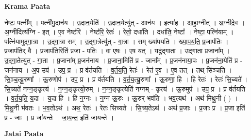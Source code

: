 \documentclass[17pt]{extarticle}
\begin{document}
\textbf{Krama Paata} \newline

नेष्टः॒ पत्नी᳚म् । पत्नी॑मु॒दान॑य । उ॒दान॒येति॑ । उ॒दान॒येत्यु॑त् - आन॑य । इत्या॑ह । आ॒हा॒ग्नीत् । अ॒ग्नीदे॒व । अ॒ग्नीदित्य॑ग्नि - इत् । ए॒व नेष्ट॑रि । नेष्ट॑रि॒ रेतः॑ । रेतो॒ दधा॑ति । दधा॑ति॒ नेष्टा᳚ । नेष्टा॒ पत्नि॑याम् । पत्नि॑यामुद्गा॒त्रा । उ॒द्‍गा॒त्रा सम् । उ॒द्‍गा॒त्रेत्यु॑त् - गा॒त्रा । सम् ख्या॑पयति । ख्या॒प॒य॒ति॒ प्र॒जाप॑तिः । प्र॒जाप॑ति॒र् वै । प्र॒जाप॑ति॒रिति॑ प्र॒जा - प॒तिः॒ । वा ए॒षः । ए॒ष यत् । यदु॑द्‍गा॒ता । उ॒द्‍गा॒ता प्र॒जाना᳚म् । उ॒द्‍गा॒तेत्यु॑त् - गा॒ता । प्र॒जाना᳚म् प्र॒जन॑नाय । प्र॒जाना॒मिति॑ प्र - जाना᳚म् । प्र॒जन॑नाया॒पः । प्र॒जन॑ना॒येति॑ प्र - जन॑नाय । अ॒प उप॑ । उप॒ प्र । प्र व॑र्तयति । व॒र्त॒य॒ति॒ रेतः॑ । रेत॑ ए॒व । ए॒व तत् । तथ् सि॑ञ्चति । सि॒ञ्च॒त्यू॒रुणा᳚ । ऊ॒रुणोप॑ । उप॒ प्र । प्र व॑र्तयति । व॒र्त॒य॒त्यू॒रुणा᳚ । ऊ॒रुणा॒ हि । हि रेतः॑ । रेतः॑ सि॒च्यते᳚ । सि॒च्यते॑ नग्न॒ङ्‍कृत्य॑ । न॒ग्न॒ङ्‍कृत्यो॒रुम् । न॒ग्न॒ङ्‍कृत्येति॑ नग्नम् - कृत्य॑ । ऊ॒रुमुप॑ । उप॒ प्र । प्र व॑र्तयति । व॒र्त॒य॒ति॒ य॒दा । य॒दा हि । हि न॒ग्नः । न॒ग्न ऊ॒रुः । ऊ॒रुर् भव॑ति । भव॒त्यथ॑ । अथ॑ मिथु॒नी ( ) । मि॒थु॒नी भ॑वतः । भ॒व॒तोऽथ॑ । अथ॒ रेतः॑ । रेतः॑ सिच्यते । सि॒च्य॒तेऽथ॑ । अथ॑ प्र॒जाः । प्र॒जाः प्र । प्र॒जा इति॑ प्र - जाः । प्र जा॑यन्ते । जा॒य॒न्त॒ इति॑ जायन्ते । \newline

\textbf{Jatai Paata} \newline
\end{document}
